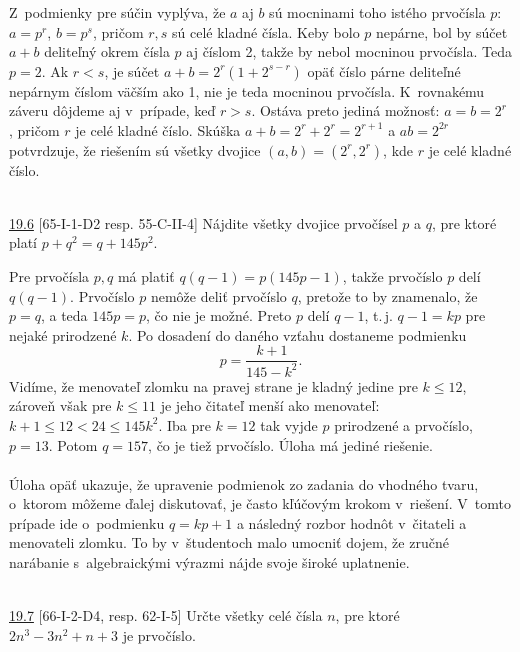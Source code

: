 \rieh Z~podmienky pre súčin vyplýva, že $a$ aj $b$ sú mocninami toho istého prvočísla $p$: $a = p^r$, $b = p^s$, pričom $r, s$ sú celé kladné čísla. Keby bolo $p$ nepárne, bol by súčet $a + b$ deliteľný okrem čísla $p$ aj číslom 2, takže by nebol mocninou prvočísla. Teda $p = 2$. Ak $r < s$, je súčet $a + b = 2^r (1 + 2^{s-r})$ opäť číslo párne deliteľné nepárnym číslom väčším ako 1, nie je teda mocninou prvočísla. K~rovnakému záveru dôjdeme aj v~prípade, keď $r > s$. Ostáva preto jediná možnosť: $a = b = 2^r$ , pričom $r$ je celé kladné číslo. Skúška $a+b = 2^r +2^r = 2^{r+1}$ a $ab = 2^{2r}$ potvrdzuje, že riešením sú všetky dvojice $(a, b) = (2^r, 2^r)$, kde $r$ je celé kladné číslo.\\
\\
\begin{tcolorbox}[breakable,notitle,boxrule=0pt,colback=light-gray,colframe=light-gray]\ul{19.6} [65-I-1-D2 resp. 55-C-II-4] Nájdite všetky dvojice prvočísel $p$ a $q$, pre ktoré platí $p + q^2= q + 145p^2$.

\end{tcolorbox}

\rieh Pre prvočísla $p, q$ má platiť $q(q - 1) = p(145p -1)$, takže prvočíslo $p$ delí $q(q -1)$. Prvočíslo $p$ nemôže deliť prvočíslo $q$, pretože to by znamenalo, že $p = q$, a teda $145p = p$, čo nie je možné. Preto $p$ delí $q-1$,  t.\,j. $q - 1 = kp$ pre nejaké prirodzené $k$. Po dosadení do daného vzťahu dostaneme podmienku $$p=\frac{k+1}{145-k^2}.$$ Vidíme, že menovateľ zlomku na pravej strane je kladný jedine pre $k \leq 12$, zároveň však pre $k \leq 11$ je jeho čitateľ menší ako menovateľ: $k + 1 \leq 12 < 24 \leq 145 k^2$. Iba pre $k = 12$ tak vyjde $p$ prirodzené a prvočíslo, $p = 13$. Potom $q = 157$, čo je tiež prvočíslo. Úloha má jediné riešenie.\\
\\
\kom Úloha opäť ukazuje, že upravenie podmienok zo zadania do vhodného tvaru, o~ktorom môžeme ďalej diskutovať, je často kľúčovým krokom v~riešení. V~tomto prípade ide o~podmienku $q=kp+1$ a následný rozbor hodnôt v~čitateli a menovateli zlomku. To by v~študentoch malo umocniť dojem, že zručné narábanie s~algebraickými výrazmi nájde svoje široké uplatnenie.\\
\\
\begin{tcolorbox}[breakable,notitle,boxrule=0pt,colback=light-gray,colframe=light-gray]\ul{19.7} [66-I-2-D4, resp. 62-I-5]
Určte všetky celé čísla $n$, pre ktoré $2n^3 -3n^2 +n+3$ je prvočíslo.

\end{tcolorbox}


